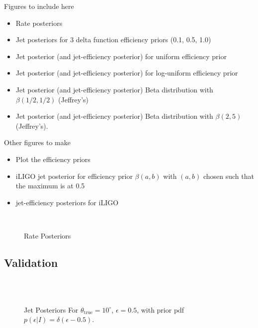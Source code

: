 \documentclass[twocolumn,nofootinbib]{revtex4-1}
\begin{document}
Figures to include here
\begin{itemize}
\item Rate posteriors
\item Jet posteriors for 3 delta function efficiency priors (0.1, 0.5, 1.0)
\item Jet posterior (and jet-efficiency posterior) for uniform efficiency prior
\item Jet posterior (and jet-efficiency posterior) for log-uniform efficiency
prior 
\item Jet posterior (and jet-efficiency posterior) Beta distribution with
$\beta(1/2,1/2)$ (Jeffrey's)
\item Jet posterior (and jet-efficiency posterior) Beta distribution with
$\beta(2,5)$ (Jeffrey's).
\end{itemize}

Other figures to make
\begin{itemize}
\item Plot the efficiency priors
\item iLIGO jet posterior for efficiency prior $\beta(a,b)$ with $(a,b)$ chosen
such that the maximum is at 0.5
\item jet-efficiency posteriors for iLIGO
\end{itemize}


\begin{figure}%
\centering
{}\\
\caption{Rate Posteriors}
\end{figure}

\subsection{Validation}

\begin{figure}%
\centering
{}\\
\\
\caption{Jet Posteriors For $\theta_{\mathrm{true}} = 10^{\circ}$,
$\epsilon=0.5$, with prior pdf $p(\epsilon|I) = \delta(\epsilon-0.5)$.}
\end{figure}
\end{document}

